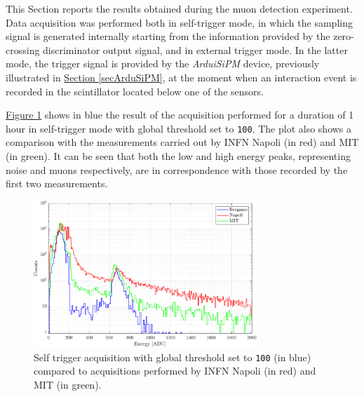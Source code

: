 This Section reports the results obtained during the muon detection experiment. Data acquisition was performed both in self-trigger mode, in which the sampling signal is generated internally starting from the information provided by the zero-crossing discriminator output signal, and in external trigger mode. In the latter mode, the trigger signal is provided by the \textit{ArduiSiPM} device, previously illustrated in \hyperref[secArduSiPM]{Section \ref{secArduSiPM}}, at the moment when an interaction event is recorded in the scintillator located below one of the sensors.

\par
\hyperref[figMUONSconfronto]{Figure \ref{figMUONSconfronto}} shows in blue the result of the acquisition performed for a duration of 1 hour in self-trigger mode with global threshold set to \texttt{100}. The plot also shows a comparison with the measurements carried out by INFN Napoli (in red) and MIT (in green). It can be seen that both the low and high energy peaks, representing noise and muons respectively, are in correspondence with those recorded by the first two measurements.

\begin{figure}[h!]
    \centering
    \includegraphics[width=0.75\textwidth]{Images/chap3/results/muons/incoming_energy_comparison.pdf}
    \caption{ Self trigger acquisition with global threshold set to \texttt{100} (in blue) compared to acquisitions performed by INFN Napoli (in red) and MIT (in green).}
    \label{figMUONSconfronto}
\end{figure}


